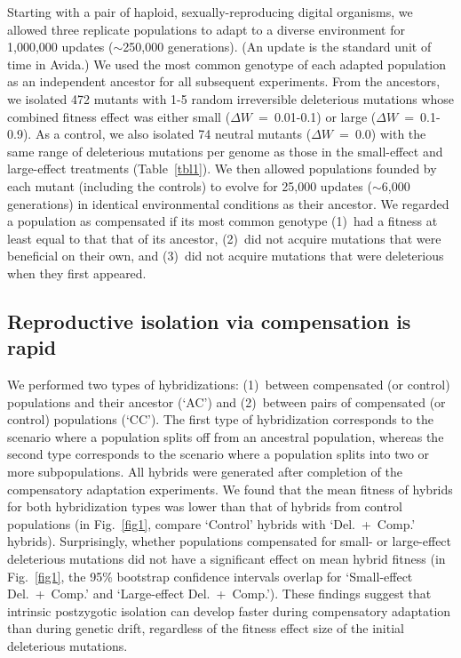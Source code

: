 \documentclass{article}
\begin{document}
Starting with a pair of haploid, sexually-reproducing digital organisms,
we allowed three replicate populations to adapt to a diverse environment
for 1,000,000 updates ($\sim$250,000 generations).
%
(An update is the standard unit of time in Avida.)
%
We used the most common genotype of each adapted population
as an independent ancestor for all subsequent experiments.
%
From the ancestors, we isolated 472 mutants
with 1-5 random irreversible deleterious mutations
whose combined fitness effect was either
small ($\Delta W$~=~0.01-0.1) or large ($\Delta W$~=~0.1-0.9).
%
As a control, we also isolated 74 neutral mutants ($\Delta W$~=~0.0)
with the same range of deleterious mutations per genome as those
in the small-effect and large-effect treatments (Table~\ref{tbl1}).
%
We then allowed populations founded by each mutant (including the controls)
to evolve for 25,000 updates ($\sim$6,000 generations)
in identical environmental conditions as their ancestor.
%
We regarded a population as compensated if its most common genotype
(1)~had a fitness at least equal to that that of its ancestor,
(2)~did not acquire mutations that were beneficial on their own, and
(3)~did not acquire mutations that were deleterious when they first appeared.



\subsection*{Reproductive isolation via compensation is rapid}

We performed two types of hybridizations:
(1)~between compensated (or control) populations and their ancestor (`AC')
and (2)~between pairs of compensated (or control) populations (`CC').
%
The first type of hybridization corresponds to the scenario where
a population splits off from an ancestral population,
whereas the second type corresponds to the scenario where
a population splits into two or more subpopulations.
%
All hybrids were generated after completion
of the compensatory adaptation experiments.
%
We found that the mean fitness of hybrids for both hybridization types
was lower than that of hybrids from control populations
(in Fig.~\ref{fig1}, compare `Control' hybrids with `Del.~+~Comp.' hybrids).
%
Surprisingly, whether populations compensated for
small- or large-effect deleterious mutations
did not have a significant effect on mean hybrid fitness
(in Fig.~\ref{fig1}, the 95\% bootstrap confidence intervals overlap for
`Small-effect Del.~+~Comp.' and `Large-effect Del.~+~Comp.').
%
These findings suggest that intrinsic postzygotic isolation
can develop faster during compensatory adaptation than during genetic drift,
regardless of the fitness effect size of the initial deleterious mutations.
\end{document}
